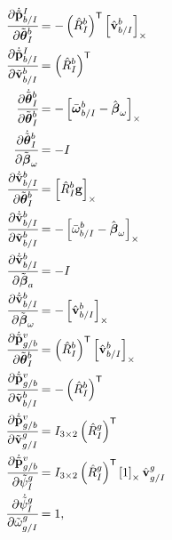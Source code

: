 \begin{align}
    \cfrac{ \partial \dot{\tilde{\boldsymbol{\mathrm{p}}}}_{b/I}^{I}}{ \partial \tilde{\boldsymbol{\mathrm{\theta}}}_I^{b}}
    &=
      - \left( \hat{R}_I^b \right)^{\mathsf{T}}
      \left[ \hat{\boldsymbol{\mathrm{v}}}_{b/I}^b \right]_{\times} \\
               \cfrac{ \partial \dot{\tilde{\boldsymbol{\mathrm{p}}}}_{b/I}^{I} }{ \partial \tilde{\boldsymbol{\mathrm{v}}}_{b/I}^b }
    &=
      \left( \hat{R}_I^b \right)^{\mathsf{T}} \\
      \cfrac{ \partial \dot{\tilde{\boldsymbol{\mathrm{\theta}}}}_I^{b} }{ \partial \tilde{\boldsymbol{\mathrm{\theta}}}_I^{b} }
    &=
      -\left[  \bar{\boldsymbol{\mathrm{\omega}}}_{b/I}^b
      - \hat{\boldsymbol{\mathrm{\beta}}}_\omega \right]_{\times} \\
      \cfrac{ \partial \dot{\tilde{\boldsymbol{\mathrm{\theta}}}}_I^{b} }{ \partial \tilde{\boldsymbol{\mathrm{\beta}}}_{\omega} }
    &=
      -I \\
      \cfrac{ \partial \dot{\tilde{\boldsymbol{\mathrm{v}}}}_{b/I}^b }{ \partial \tilde{\boldsymbol{\mathrm{\theta}}}_I^{b} }
    &=
      \left[  \hat{R}_I^b \boldsymbol{\mathrm{g}}  \right]_{\times} \\
      \cfrac{ \partial \dot{\tilde{\boldsymbol{\mathrm{v}}}}_{b/I}^b }{ \partial \tilde{\boldsymbol{\mathrm{v}}}_{b/I}^b }
    &=
      -\left[  \bar{\omega}_{b/I}^b - \hat{\boldsymbol{\mathrm{\beta}}}_\omega  \right]_{\times} \\
      \cfrac{ \partial \dot{\tilde{\boldsymbol{\mathrm{v}}}}_{b/I}^b }{ \partial \tilde{\boldsymbol{\mathrm{\beta}}}_a }
    &=
      -I \\
      \cfrac{ \partial \dot{\tilde{\boldsymbol{\mathrm{v}}}}_{b/I}^b }{ \partial \tilde{\boldsymbol{\mathrm{\beta}}}_{\omega} }
    &=
      -\left[  \hat{\boldsymbol{\mathrm{v}}}_{b/I}^b  \right]_{\times} \\
      \cfrac{ \partial \dot{\tilde{\boldsymbol{\mathrm{p}}}}_{g/b}^{v} }{ \partial \tilde{\boldsymbol{\mathrm{\theta}}}_I^{b} }
    &=
      \left( \hat{R}_{I}^{b} \right)^{\mathsf{T}}
      \left[  \hat{\boldsymbol{\mathrm{v}}}_{b/I}^{b}  \right]_{\times} \\
      \cfrac{ \partial \dot{\tilde{\boldsymbol{\mathrm{p}}}}_{g/b}^{v} }{ \partial \tilde{\boldsymbol{\mathrm{v}}}_{b/I}^b }
    &=
      -\left( \hat{R}_{I}^{b} \right)^{\mathsf{T}} \\
      \cfrac{ \partial \dot{\tilde{\boldsymbol{\mathrm{p}}}}_{g/b}^{v} }{ \partial \tilde{\boldsymbol{\mathrm{v}}}_{g/I}^{g} }
    &=
      I_{3 \times 2} \left( \hat{R}_{I}^{g} \right)^{\mathsf{T}} \\
      \cfrac{ \partial \dot{\tilde{\boldsymbol{\mathrm{p}}}}_{g/b}^{v} }{ \partial \tilde{\psi}_{I}^{g} }
    &=
               I_{3 \times 2} \left( \hat{R}_{I}^{g} \right)^{\mathsf{T}}
               \left[  1  \right]_{\times} \hat{\boldsymbol{\mathrm{v}}}_{g/I}^g \\
               \cfrac{ \partial \dot{\tilde{\psi}}_{I}^{g} }{ \partial \tilde{\omega}_{g/I}^{g} }
    &=
      1 ,
\end{align}
